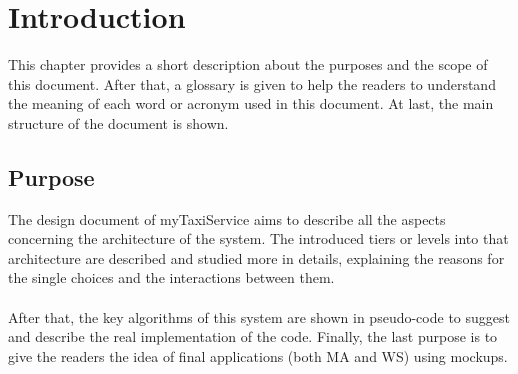\documentclass[../dd]{subfiles}
\begin{document}
\chapter{Introduction} %
\label{introduction}

\setmyfancystyle

This chapter provides a short description about the purposes and the scope of this document. After that, a glossary is given to help the readers to understand the meaning of each word or acronym used in this document. At last, the main structure of the document is shown.

\section{Purpose}
The design document of myTaxiService aims to describe all the aspects concerning the architecture of the system. The introduced tiers or levels into that architecture are described and studied more in details, explaining the reasons for the single choices and the interactions between them.\\
\\
After that, the key algorithms of this system are shown in pseudo-code to suggest and describe the real implementation of the code. Finally, the last purpose is to give the readers the idea of final applications (both MA and WS) using mockups.
\end{document}
